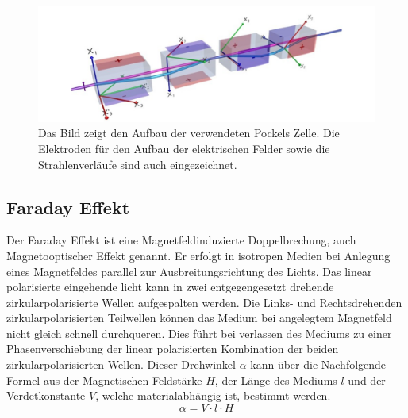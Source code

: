 \begin{figure}[h]
	\centering
	\includegraphics[scale=0.7]{Bilder/kristalle}
	\caption[Aufbau der Pockels Zelle]{\small Das Bild zeigt den Aufbau der verwendeten Pockels Zelle. Die Elektroden für den Aufbau der elektrischen Felder sowie die Strahlenverläufe sind auch eingezeichnet.}
	\label{kristalle}
\end{figure}


\subsection{Faraday Effekt}
Der Faraday Effekt ist eine Magnetfeldinduzierte Doppelbrechung, auch Magnetooptischer Effekt genannt. Er erfolgt in isotropen Medien bei Anlegung eines Magnetfeldes parallel zur Ausbreitungsrichtung des Lichts. Das linear polarisierte eingehende licht kann in zwei entgegengesetzt drehende zirkularpolarisierte Wellen aufgespalten werden. Die Links- und Rechtsdrehenden zirkularpolarisierten Teilwellen können das Medium bei angelegtem Magnetfeld nicht gleich schnell durchqueren. Dies führt bei verlassen des Mediums zu einer Phasenverschiebung der linear polarisierten Kombination der beiden zirkularpolarisierten Wellen. Dieser Drehwinkel $\alpha$ kann über die Nachfolgende Formel aus der Magnetischen Feldstärke $H$, der Länge des Mediums $l$ und der Verdetkonstante $V$, welche materialabhängig ist, bestimmt werden. 
\begin{equation}\label{faraday_unfertig}
\alpha = V \cdot l \cdot H
\end{equation}
